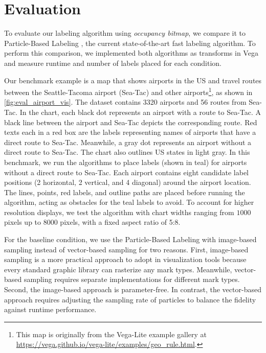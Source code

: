 \section{Evaluation}

To evaluate our labeling algorithm using \emph{occupancy bitmap}, we compare it to Particle-Based Labeling \cite{luboschik:particle}, the current state-of-the-art fast labeling algorithm.
To perform this comparison, we implemented both algorithms as transforms in Vega~\cite{satyanarayan:vega}
and measure runtime and number of labels placed for each condition.

Our benchmark example is a map that shows airports in the US
and travel routes between the Seattle-Tacoma airport (Sea-Tac) and other airports\footnote{This map is originally from the Vega-Lite example gallery at \url{https://vega.github.io/vega-lite/examples/geo_rule.html}.}, as shown in \autoref{fig:eval_airport_vis}.
The dataset contains 3320 airports and 56 routes from Sea-Tac.
In the chart, each black dot represents an airport with a route to Sea-Tac.
A black line between the airport and Sea-Tac depicts the corresponding route.
Red texts each in a red box are the labels representing names of airports that have a direct route to Sea-Tac.
Meanwhile, a gray dot represents an airport without a direct route to Sea-Tac.
The chart also outlines US states in light gray.
In this benchmark, we run the algorithms to place labels (shown in teal) for airports without a direct route to Sea-Tac.
Each airport contains eight candidate label positions (2 horizontal, 2 vertical, and 4 diagonal) around the airport location.
The lines, points, red labels, and outline paths are placed before running the algorithm,
acting as obstacles for the teal labels to avoid.
To account for higher resolution displays, we test the algorithm with chart widths ranging from $1000$ pixels up to $8000$ pixels, with a fixed aspect ratio of 5:8.

For the baseline condition, we use the Particle-Based Labeling\cite{luboschik:particle} with image-based sampling instead of vector-based sampling for two reasons.
First, image-based sampling is a more practical approach to adopt in visualization tools because 
every standard graphic library can rasterize any mark types.
Meanwhile, vector-based sampling requires separate implementations for different mark types.
Second, the image-based approach is parameter-free.
In contrast, the vector-based approach requires adjusting the sampling rate of particles to balance the fidelity against runtime performance.

